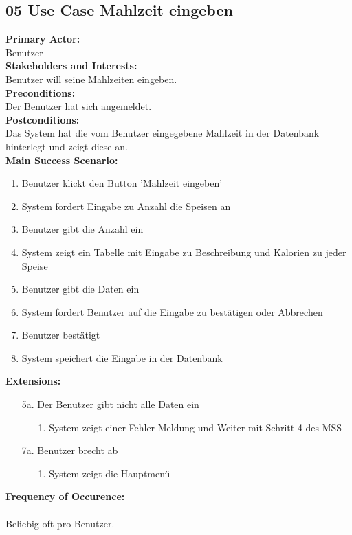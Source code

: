 \documentclass[12pt,a4paper,onecolumn]{article}
\begin{document}
\subsection{05 Use Case Mahlzeit eingeben}
\textbf{Primary Actor:}\\ Benutzer\\
\textbf{Stakeholders and Interests:}\\
Benutzer will seine Mahlzeiten eingeben.\\
\textbf{Preconditions:} \\ Der Benutzer hat sich angemeldet.\\
\textbf{Postconditions:}\\Das System hat die vom Benutzer eingegebene \gls{Mahlzeit} in der Datenbank hinterlegt und
zeigt diese an.\\
\textbf{Main Success Scenario:}
\begin{enumerate}
    \item Benutzer klickt den Button 'Mahlzeit eingeben'
    \item System fordert Eingabe zu Anzahl die Speisen an
    \item Benutzer gibt die Anzahl ein
    \item System zeigt ein Tabelle mit Eingabe zu Beschreibung und Kalorien zu jeder Speise 
    \item Benutzer gibt die Daten ein
    \item System fordert Benutzer auf die Eingabe zu bestätigen oder Abbrechen
    \item Benutzer bestätigt
    \item System speichert die Eingabe in der Datenbank
\end{enumerate}
\textbf{Extensions:}
\begin{enumerate}
    \item [5a.]  Der Benutzer gibt nicht alle Daten ein
    \begin{enumerate}
        \item[1.] System zeigt einer Fehler Meldung und Weiter mit Schritt 4 des MSS
    \end{enumerate}
    \item [7a.]  Benutzer brecht ab\\
    \begin{enumerate}
        \item[1.]System zeigt die Hauptmenü
    \end{enumerate}
\end{enumerate}
\textbf{Frequency of Occurence:}\\ \\
Beliebig oft pro Benutzer. 
\end{document}
